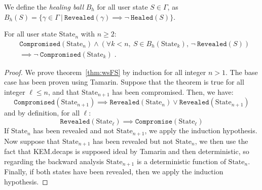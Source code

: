 \begin{definition}
\label{def:healing-ball}
We define the \emph{healing ball} $B_h$ for all user state $S \in \Gamma$, as $B_h(S) = \{\gamma \in \Gamma~|~\texttt{Revealed}(\gamma) \implies \lnot \ \texttt{Healed}(S)\}$.
\end{definition}

\begin{theorem}
\label{thm:wsFS}
For all user state $\text{State}_n$ with $n \ge 2$: 
\begin{align*}
& \texttt{Compromised}(\text{State}_{n}) \land \left(\forall k < n,\ S \in B_h(\text{State}_k)\mbox{, } \lnot \ \texttt{Revealed}(S)\right)\\
& \implies \lnot \ \texttt{Compromised}(\text{State}_k) \; .
\end{align*}
\end{theorem}

\begin{proof}
We prove theorem~\ref{thm:wsFS} by induction for all integer $n > 1$. The base case has been proven using Tamarin. Suppose that the theorem is true for all integer $\ell \le n$, and that $\text{State}_{n+1}$ has been compromised. Then, we have:
\[
\texttt{Compromised}(\text{State}_{n+1}) \implies \texttt{Revealed}(\text{State}_{n}) \lor \texttt{Revealed}(\text{State}_{n+1}) \]
and by definition, for all $\ell$:
\[\texttt{Revealed}(\text{State}_\ell) \implies \texttt{Compromise}(\text{State}_\ell) \]
If $\text{State}_n$ has been revealed and not $\text{State}_{n+1}$, we apply the induction hypothesis.
Now suppose that $\text{State}_{n+1}$ has been revealed but not $\text{State}_n$, we then use the fact that KEM.decaps is supposed ideal by Tamarin and then deterministic, so regarding the backward analysis $\text{State}_{n+1}$ is a deterministic function of $\text{State}_n$. Finally, if both states have been revealed, then we apply the induction hypothesis.
\end{proof}
